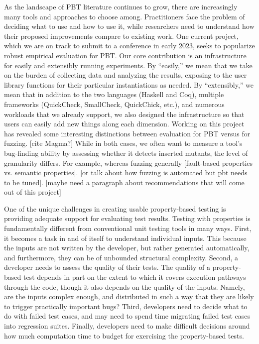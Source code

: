 As the landscape of PBT literature continues to grow, there are increasingly many tools and approaches to choose among. Practitioners face the problem of deciding what to use and how to use it, while researchers need to understand how their proposed improvements compare to existing work.
One current project, which we are on track to submit to a conference in early 2023, seeks to popularize robust empirical evaluation for PBT. Our core contribution is an infrastructure for easily and extensibly running experiments. By “easily,” we mean that we take on the burden of collecting data and analyzing the results, exposing to the user library functions for their particular instantiations as needed. By “extensibly,” we mean that in addition to the two languages (Haskell and Coq), multiple frameworks (QuickCheck, SmallCheck, QuickChick, etc.), and numerous workloads that we already support, we also designed the infrastructure so that users can easily add new things along each dimension.
Working on this project has revealed some interesting distinctions between evaluation for PBT versus for fuzzing. [cite Magma?] While in both cases, we often want to measure a tool’s bug-finding ability by assessing whether it detects inserted mutants, the level of granularity differs. For example, whereas fuzzing generally [fault-based properties vs. semantic properties]. [or talk about how fuzzing is automated but pbt needs to be tuned].
[maybe need a paragraph about recommendations that will come out of this project]

\label{sec:val}

One of the unique challenges in creating usable property-based testing is
providing adequate support for evaluating test results. Testing with properties
is fundamentally different from conventional unit testing tools in many ways.
First, it becomes a task in and of itself to understand individual inputs. This
because the inputs are not written by the developer, but rather generated
automatically, and furthermore, they can be of unbounded structural complexity.
Second, a developer needs to assess the quality of their tests. The quality of a
property-based test depends in part on the extent to which it covers execution
pathways through the code, though it also depends on the quality of the inputs.
Namely, are the inputs complex enough, and distributed in such a way that they
are likely to trigger practically important bugs? Third, developers need to
decide what to do with failed test cases, and may need to spend time migrating
failed test cases into regression suites. Finally, developers need to make
difficult decisions around how much computation time to budget for exercising
the property-based tests.

